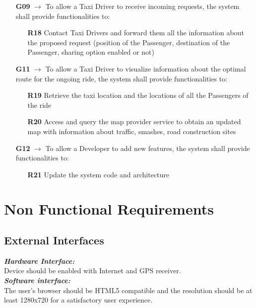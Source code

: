 \begin{itemize}
	\item [\textbf{G09}] $\rightarrow$ To allow a Taxi Driver to receive incoming requests, the system shall provide functionalities to:
	\begin{itemize}
		\item [\textbf{R18}] Contact Taxi Drivers and forward them all the information about the proposed request (position of the Passenger, destination of the Passenger, sharing option enabled or not)
	\end{itemize}		
	
	\item [\textbf{G11}] $\rightarrow$ To allow a Taxi Driver to visualize information about the optimal route for the ongoing ride, the system shall provide functionalities to:
	\begin{itemize}
		\item [\textbf{R19}] Retrieve the taxi location and the locations of all the Passengers of the ride
		\item [\textbf{R20}] Access and query the map provider service to obtain an updated map with information about traffic, smashes, road construction sites
	\end{itemize}
	
	\item [\textbf{G12}] $\rightarrow$ To allow a Developer to add new features, the system shall provide functionalities to:
	\begin{itemize}
		\item [\textbf{R21}] Update the system code and architecture
	\end{itemize}
\end{itemize}

\section{Non Functional Requirements}

\subsection{External Interfaces}
\textit{\textbf{Hardware Interface:}}\\
Device should be enabled with Internet and GPS receiver.\\
\textit{\textbf{Software interface:}}\\
The user's browser should be HTML5 compatible and the resolution should be at least 1280x720 for a satisfactory user experience.\\

